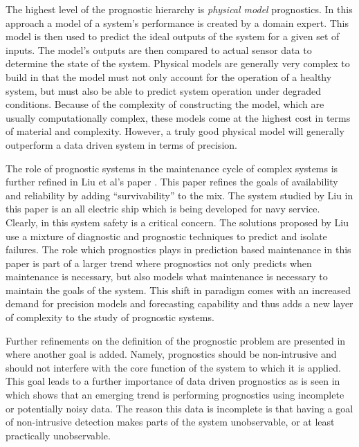 \documentclass[12pt]{article}
\begin{document}
The highest level of the prognostic hierarchy is {\em physical model}
prognostics.  In this approach a model of a system's performance is
created by a domain expert.  This model is then used to predict the
ideal outputs of the system for a given set of inputs.  The model's
outputs are then compared to actual sensor data to determine the state
of the system.  Physical models are generally very complex to build in
that the model must not only account for the operation of a healthy
system, but must also be able to predict system operation under
degraded conditions.  Because of the complexity of constructing the
model, which are usually computationally complex, these models come at
the highest cost in terms of material and complexity.  However, a
truly good physical model will generally outperform a data driven
system in terms of precision.

The role of prognostic systems in the maintenance cycle of complex
systems is further refined in Liu et al's paper \cite{4273732}.  This
paper refines the goals of availability and reliability by adding
``survivability'' to the mix.  The system studied by Liu in this paper
is an all electric ship which is being developed for navy service.
Clearly, in this system safety is a critical concern.  The solutions
proposed by Liu use a mixture of diagnostic and prognostic techniques
to predict and isolate failures.  The role which prognostics plays in
prediction based maintenance in this paper is part of a larger trend
where prognostics not only predicts when maintenance is necessary, but
also models what maintenance is necessary to maintain the goals of the
system.  This shift in paradigm comes with an increased demand for
precision models and forecasting capability and thus adds a new layer
of complexity to the study of prognostic systems.

Further refinements on the definition of the prognostic problem are
presented in \cite{4585821} where another goal is added.  Namely,
prognostics should be non-intrusive and should not interfere with the
core function of the system to which it is applied.  This goal leads
to a further importance of data driven prognostics as is seen in
\cite{5393625} which shows that an emerging trend is performing
prognostics using incomplete or potentially noisy data.  The reason
this data is incomplete is that having a goal of non-intrusive
detection makes parts of the system unobservable, or at least
practically unobservable.
\end{document}
